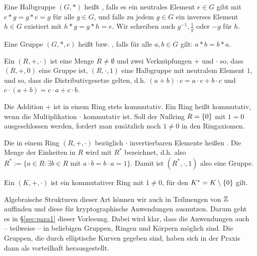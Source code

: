 \begin{defn}[Gruppe]
	Eine Halbgruppe $(G,*)$ heißt , falls es ein neutrales Element $e \in G$ gibt mit $e*g = g*e = g$ für alle $g \in G$, und falls zu jedem $g \in G$ ein inverses Element $h \in G$ existiert mit $h * g = g * h = e$. 
	Wir schreiben auch $g^{-1}, \frac{1}{g}$ oder $-g$ für $h$.
\end{defn}

\begin{defn}
	Eine Gruppe $(G,*,e)$ heißt  bzw. , falls für alle $a, b \in G$ gilt: $a * b = b*a$. 
\end{defn}

\begin{defn}[Ring]
	Ein  $(R,+,\cdot)$  ist eine Menge $R \neq \emptyset$ und zwei Verknüpfungen $+$ und $\cdot$ so, dass $(R,+,0)$ eine Gruppe ist, $(R,\cdot,1)$ eine Halbgruppe mit neutralem Element $1$, und so, dass die Distributivgesetze gelten, d.h. $(a+b) \cdot c = a \cdot c + b \cdot c$ und $c \cdot (a+b) = c \cdot a + c \cdot b$.
\end{defn}

\begin{bem}
	Die Addition $+$ ist in einem Ring stets kommutativ. 
	Ein Ring heißt kommutativ, wenn die Multiplikation $\cdot$ kommutativ ist. 
	Soll der Nullring $R = \{0\}$ mit $1 = 0$ ausgeschlossen werden, fordert man zusätzlich noch $1 \neq 0$ in den Ringaxiomen.
\end{bem}

\begin{defn}
	Die in einem Ring $(R,+,\cdot)$ bezüglich $\cdot$ invertierbaren Elemente heißen . 
	Die Menge der Einheiten in $R$ wird mit $R^*$ bezeichnet, d.h. also $R^* := \{a \in R : \exists b \in R \text{ mit } a \cdot b = b \cdot a = 1\}$. 
	Damit ist $(R^*,\cdot,1)$ also eine Gruppe. 
\end{defn}

\begin{defn}[Körper]
	Ein  $(K,+,\cdot)$ ist ein kommutativer Ring mit $1 \neq 0$, für den $K^* = K \setminus \{0\}$ gilt.
\end{defn}

Algebraische Strukturen dieser Art können wir auch in Teilmengen von $\mathbb{Z}$ auffinden und diese für kryptographische Anwendungen ausnutzen. 
Darum geht es in §\ref{sec:para1} dieser Vorlesung. 
Dabei wird klar, dass die Anwendungen auch -- teilweise -- in beliebigen Gruppen, Ringen und Körpern möglich sind. 
Die Gruppen, die durch elliptische Kurven gegeben sind, haben sich in der Praxis dann als vorteilhaft herausgestellt.

